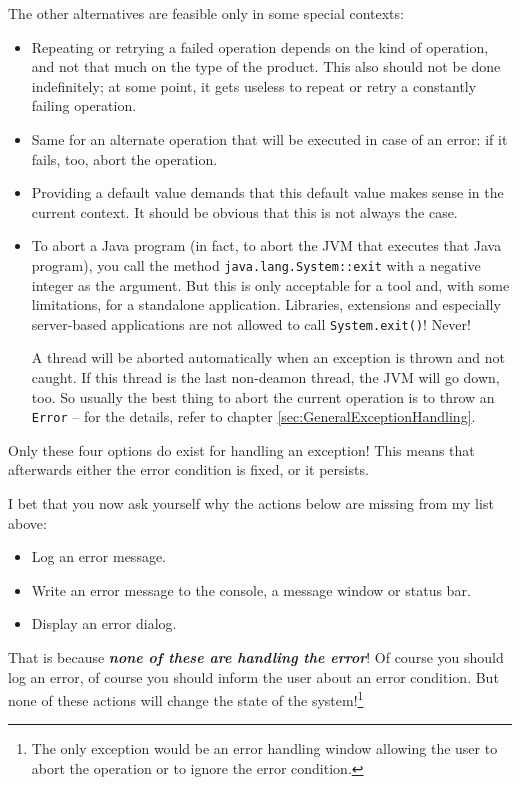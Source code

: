 \documentclass[11pt,a4paper, titlepage, parskip=half, headsepline, footsepline, cleardoublepage=current, headheight=1cm]{scrbook}
\newcommand*{\tqref}[1]{\hyperref[{#1}]{\ref*{#1}}}
\begin{document}
The other alternatives are feasible only in some special contexts:
\begin{itemize}
\item{Repeating or retrying a failed operation depends on the kind of operation, and not that much on the type of the product. This also should not be done indefinitely; at some point, it gets useless to repeat or retry a constantly failing operation.}

\item{Same for an alternate operation that will be executed in case of an error: if it fails, too, abort the operation.}

\item{Providing a default value demands that this default value makes sense in the current context. It should be obvious that this is not always the case.}

\item{To abort a Java program (in fact, to abort the JVM that executes that Java program), you call the method \lstinline|java.lang.System::exit|\autocite{ORACLE_DOC_SYSTEM:exit} with a negative integer as the argument. But this is only acceptable for a tool and, with some limitations, for a standalone application. Libraries, extensions and especially server-based applications are not allowed to call \lstinline|System.exit()|! Never!

A thread will be aborted automatically when an exception is thrown and not caught. If this thread is the last non-deamon thread, the JVM will go down, too. So usually the best thing to abort the current operation is to throw an \lstinline|Error| – for the details, refer to chapter \tqref{sec:GeneralExceptionHandling}.}
\end{itemize}

Only these four options do exist for handling an exception! This means that afterwards either the error condition is fixed, or it persists.

I bet that you now ask yourself why the actions below are missing from my list above:
\begin{itemize}
\item{Log an error message.}
\item{Write an error message to the console, a message window or status bar.}
\item{Display an error dialog.}
\end{itemize}

That is because \textit{\textbf{none of these are handling the error}}! Of course you should log an error, of course you should inform the user about an error condition. But none of these actions will change the state of the system!\footnote{The only exception would be an error handling window allowing the user to abort the operation or to ignore the error condition.}
\end{document}
